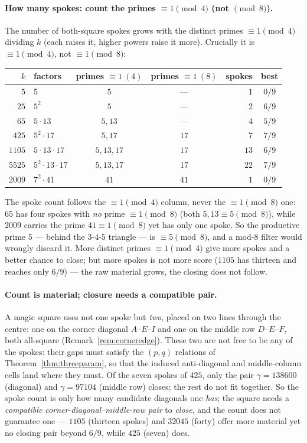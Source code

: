\documentclass[11pt]{article}
\theoremstyle{definition}
\begin{document}
\paragraph{How many spokes: count the primes $\equiv1\pmod4$ (not $\pmod8$).} The number of
both-square spokes grows with the distinct primes $\equiv1\pmod4$ dividing $k$ (each raises
it, higher powers raise it more). Crucially it is $\equiv1\pmod4$, not $\equiv1\pmod8$:
\begin{center}\small
\begin{tabular}{rlccrc}
\hline
$k$ & factors & primes $\equiv1\ (4)$ & primes $\equiv1\ (8)$ & spokes & best\\
\hline
$5$    & $5$                & $5$        & ---   & $1$  & $0/9$\\
$25$   & $5^2$              & $5$        & ---   & $2$  & $6/9$\\
$65$   & $5\cdot13$         & $5,13$     & ---   & $4$  & $5/9$\\
$425$  & $5^2\cdot17$       & $5,17$     & $17$  & $7$  & $7/9$\\
$1105$ & $5\cdot13\cdot17$  & $5,13,17$  & $17$  & $13$ & $6/9$\\
$5525$ & $5^2\cdot13\cdot17$& $5,13,17$  & $17$  & $22$ & $7/9$\\
$2009$ & $7^2\cdot41$       & $41$       & $41$  & $1$  & $0/9$\\
\hline
\end{tabular}
\end{center}
The spoke count follows the $\equiv1\pmod4$ column, never the $\equiv1\pmod8$ one: $65$ has
four spokes with \emph{no} prime $\equiv1\pmod8$ (both $5,13\equiv5\pmod8$), while $2009$
carries the prime $41\equiv1\pmod8$ yet has only one spoke. So the productive prime $5$ ---
behind the $3\text{-}4\text{-}5$ triangle --- is $\equiv5\pmod8$, and a mod-$8$ filter would
wrongly discard it. More distinct primes $\equiv1\pmod4$ give more spokes and a better chance
to close; but more spokes is not more score ($1105$ has thirteen and reaches only $6/9$) ---
the raw material grows, the closing does not follow.

\paragraph{Count is material; closure needs a compatible pair.} A magic square uses not one
spoke but \emph{two}, placed on two lines through the centre: one on the corner diagonal
$A$--$E$--$I$ and one on the middle row $D$--$E$--$F$, both all-square
(Remark~\ref{rem:corneredge}). These two are not free to be any of the spokes: their gaps must
satisfy the $(p,q)$ relations of Theorem~\ref{thm:threeparam}, so that the induced
anti-diagonal and middle-column cells land where they must. Of the seven spokes of $425$, only
the pair $\gamma=138600$ (diagonal) and $\gamma=97104$ (middle row) closes; the rest do not fit
together. So the spoke count is only how many candidate diagonals one \emph{has}; the square
needs a \emph{compatible corner-diagonal--middle-row pair} to \emph{close}, and the count does
not guarantee one --- $1105$ (thirteen spokes) and $32045$ (forty) offer more material yet no
closing pair beyond $6/9$, while $425$ (seven) does.
\end{document}
